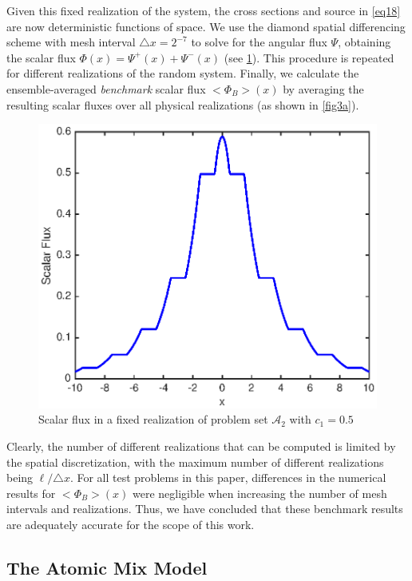 \documentclass[12pt]{article}
\newcommand{\bl}{\big<}
\newcommand{\bg}{\big>}
\newcommand{\seta}{\mathcal{A}}
\begin{document}
{Given this fixed realization of the system, the cross sections and source in \cref{eq18} are now deterministic functions of space.
We use the diamond spatial differencing scheme with mesh interval $\triangle x=2^{-7}$ to solve for the angular flux $\Psi$, obtaining the scalar flux $\Phi(x) = \Psi^+(x)+\Psi^-(x)$ (see \cref{fig4}).
This procedure is repeated for different realizations of the random system.
Finally, we calculate the ensemble-averaged {\em benchmark} scalar flux $\bl\Phi_B\bg(x)$ by averaging the resulting scalar fluxes over all physical realizations (as shown in \cref{fig3a}). 
\begin{figure}[htb]
  \centering
  \includegraphics[scale=1]{fig4.eps}
  \caption{Scalar flux in a fixed realization of problem set {$\seta_2$} with $c_1=0.5$}
  \label{fig4}
\end{figure}

Clearly, the number of different realizations that can be computed is limited by the spatial discretization, with the maximum number of different realizations being $\ell/\triangle x$.
For all test problems in this paper, differences in the numerical results for $\bl\Phi_B\bg(x)$ were negligible when increasing the number of mesh intervals and realizations.
Thus, we have concluded that these benchmark results are adequately accurate for the scope of this work.

\subsection{The Atomic Mix Model}

}
\end{document}
